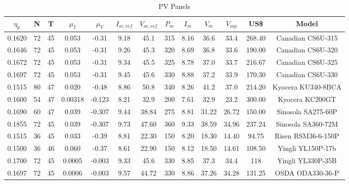 \documentclass[journal,onecolumn]{IEEEtran}
\begin{document}
\begin{table}[h]
\renewcommand{\arraystretch}{1.3}
\caption{PV Panels}\label{tab:panels}
\centering
\begin{scriptsize}
\begin{tabular}{c|c|c|c|c|c|c|c|c|c|c|c|c}
\hline
\hline
$\eta_{p}$ & N & T & $\mu_{I}$ & $\mu_{V}$ & $I_{sc,ref}$ & $V_{oc,ref}$ & $P_{m}$ & $I_{m}$ & $V_{m}$ & $V_{mp}$ & US\$ & Model \\
\hline
\hline
0.1620 & 72 & 45 & 0.053 & -0.31 & 9.18 & 45.1 & 315 & 8.16 & 36.6 & 33.4 & 268.40 & Canadian CS6U-315 \\
\hline
0.1646 & 72 & 45 & 0.053 & -0.31 & 9.26 & 45.3 & 320 & 8.69 & 36.8 & 33.6 & 190.00 &  Canadian CS6U-320 \\
\hline
0.1672 & 72 & 45 & 0.053 & -0.31 & 9.34 & 45.5 & 325 & 8.78 & 37.0 & 33.7 & 216.67 & Canadian CS6U-325 \\
\hline
0.1697 & 72 & 45 & 0.053 & -0.31 & 9.45 & 45.6 & 330 & 8.88 & 37.2 & 33.9 & 170.30 & Canadian CS6U-330 \\
\hline
0.1515 & 80 & 47 & 0.020 & -0.48 & 8.86 & 50.8 & 340 & 8.26 & 41.2 & 37.0 & 214.20 & Kyocera KU340-8BCA \\
\hline
0.1600 & 54 & 47 & 0.00318 & -0.123 & 8.21 & 32.9 & 200 & 7.61 & 32.9 & 23.2 & 300.00 & Kyocera KC200GT \\
\hline
0.1690 & 60 & 47 & 0.039 & -0.307 & 9.44 & 38.84 & 275 & 8.81 & 31.22 & 26.72 & 150.00 & Sinosola SA275-60P \\
\hline
0.1855 & 72 & 45 & 0.039 & -0.307 & 9.73 & 47.60 & 360 & 9.33 & 38.59 & 34.96 & 237.24 & Sinosola SA360-72M \\
\hline
0.1515 & 36 & 45 & 0.033 & -0.39 & 8.81 & 22.30 & 150 & 8.20 & 18.30 & 14.40 & 94.75 & Risen RSM36-6-150P \\
\hline
0.1500 & 36 & 46 & 0.060 & -0.37 & 8.61 & 22.90 & 150 & 8.12 & 18.50 & 14.61 & 108.50 & Yingli YL150P-17b \\
\hline
0.1700 & 72 & 45 & 0.0005 & -0.003 & 9.33 & 45.6 & 330 & 8.85 & 37.3 & 34.4 & 118 & Yingli YL330P-35B \\
\hline
0.1697 & 72 & 45 & 0.0006 & -0.003 & 9.57 & 44.72 & 330 & 8.86 & 37.26 & 34.28 & 131.25 & OSDA ODA330-36-P \\
\hline

\end{tabular}
\end{scriptsize}
\end{table}
\end{document}

